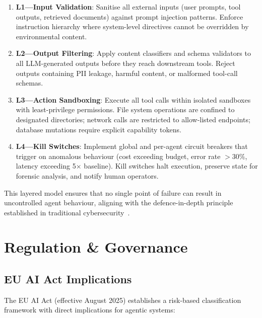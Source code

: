 \documentclass[12pt, a4paper]{article}
\begin{document}
\begin{enumerate}
    \item \textbf{L1---Input Validation}: Sanitise all external inputs (user prompts, tool outputs, retrieved documents) against prompt injection patterns. Enforce instruction hierarchy where system-level directives cannot be overridden by environmental content.
    \item \textbf{L2---Output Filtering}: Apply content classifiers and schema validators to all LLM-generated outputs before they reach downstream tools. Reject outputs containing PII leakage, harmful content, or malformed tool-call schemas.
    \item \textbf{L3---Action Sandboxing}: Execute all tool calls within isolated sandboxes with least-privilege permissions. File system operations are confined to designated directories; network calls are restricted to allow-listed endpoints; database mutations require explicit capability tokens.
    \item \textbf{L4---Kill Switches}: Implement global and per-agent circuit breakers that trigger on anomalous behaviour (cost exceeding budget, error rate $> 30\%$, latency exceeding 5$\times$ baseline). Kill switches halt execution, preserve state for forensic analysis, and notify human operators.
\end{enumerate}

This layered model ensures that no single point of failure can result in uncontrolled agent behaviour, aligning with the defence-in-depth principle established in traditional cybersecurity~\citep{nist2023ai}.

\section{Regulation \& Governance}\label{sec:governance}

\subsection{EU AI Act Implications}
The EU AI Act (effective August 2025) establishes a risk-based classification framework with direct implications for agentic systems:
\end{document}
